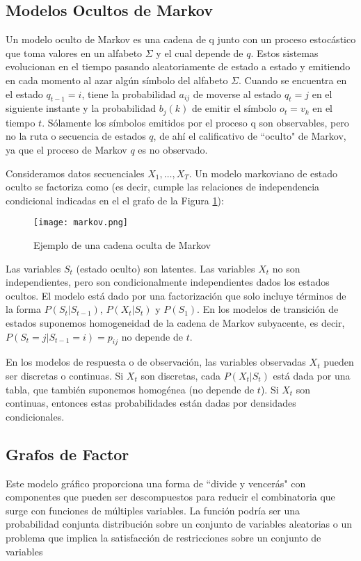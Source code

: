 \subsection{Modelos Ocultos de Markov}
Un modelo oculto de Markov es una cadena de q junto con un proceso estoc\'{a}stico que
toma valores en un alfabeto $\Sigma$ y el cual depende de $q$.
Estos sistemas evolucionan en el tiempo pasando aleatoriamente de estado a estado y
emitiendo en cada momento al azar algún símbolo del alfabeto $\Sigma$. Cuando se encuentra
en el estado $q_{t-1} = i$, tiene la probabilidad $a
_{ij}$ de moverse al estado $q_t = j$ en el siguiente
instante y la probabilidad $b_j(k)$ de emitir el s\'{i}mbolo $o_t = v_k$ en el tiempo $t$.
S\'{o}lamente los s\'{i}mbolos emitidos por el proceso q son observables, pero no la ruta o
secuencia de estados $q$, de ah\'{i} el calificativo de “oculto" de Markov, ya que el proceso
de Markov $q$ es no observado. 

Consideramos datos secuenciales $X_1,\ldots,X_T$. Un modelo markoviano de estado oculto se factoriza como (es decir, cumple las relaciones de independencia condicional indicadas en el el grafo de la Figura \ref{fig:red2}):

\begin{figure}[h]
\caption{Ejemplo de una cadena oculta de Markov}
\centering
\texttt{[image: markov.png]}
\label{fig:red2}
\end{figure}

Las variables $S_t$ (estado oculto) son latentes. Las variables $X_t$ no son independientes, pero son condicionalmente independientes dados los estados ocultos. El modelo está dado por una factorizaci\'{o}n que solo incluye t\'{e}rminos de la forma $P(S_t|S_{t-1})$, $P(X_t|S_t)$ y $P(S_1)$. En los modelos de transición de estados suponemos homogeneidad de la cadena de Markov subyacente, es decir,
$P(S_t=j|S_{t-1}=i)=p_{ij}$ no depende de $t$.

En los modelos de respuesta o de observación, las variables observadas $X_t$ pueden ser discretas o continuas. Si $X_t$ son discretas, cada $P(X_t|S_t)$ está dada por una tabla, que tambi\'{e}n suponemos homog\'{e}nea (no depende de $t$). Si $X_t$ son continuas, entonces estas probabilidades est\'{a}n dadas por densidades condicionales.

\subsection{Grafos de Factor}
Este modelo gr\'{a}fico proporciona una forma de “divide y vencer\'{a}s" con
componentes que pueden ser descompuestos para reducir el
combinatoria que surge con funciones de m\'{u}ltiples
variables. La funci\'{o}n podr\'{i}a ser una probabilidad conjunta
distribuci\'{o}n sobre un conjunto de variables aleatorias o un problema que implica la satisfacci\'{o}n de restricciones sobre un conjunto de variables


